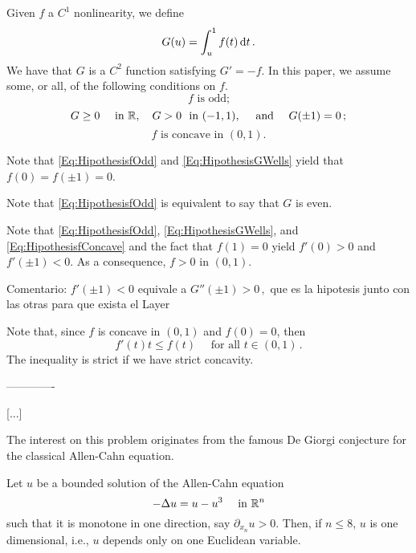 \bigskip
[...]
\bigskip

Given $f$ a $C^1$ nonlinearity, we define
$$
G(u)= \int_u^1 f(t) \,\mathrm{d} t\,.
$$
We have that $G$ is a $C^2$ function satisfying $G' = -f$. In this paper, we assume some, or all, of the following conditions on $f$.
\begin{equation}
\label{Eq:HipothesisfOdd}
f \textrm{ is odd;}
\end{equation}
\begin{equation}
\label{Eq:HipothesisGWells}
G\geq 0 \quad \textrm{ in } \mathbb{R}, \quad G > 0 \ \textrm{ in }  (-1,1), \quad \textrm{ and }\quad G(\pm 1 )=0\,;
\end{equation}
\begin{equation}
\label{Eq:HipothesisfConcave}
f \textrm{ is concave in }  (0,1).
\end{equation}



Note that \eqref{Eq:HipothesisfOdd} and \eqref{Eq:HipothesisGWells} yield that $f(0)=f(\pm 1)=0$. 

Note that \eqref{Eq:HipothesisfOdd} is equivalent to say that $G$ is even.

Note that \eqref{Eq:HipothesisfOdd}, \eqref{Eq:HipothesisGWells}, and \eqref{Eq:HipothesisfConcave} and the fact that $f(1)=0$ yield $f'(0)>0$ and $f'(\pm 1) < 0$. As a consequence, $f > 0$ in $(0,1)$.

Comentario: $f'(\pm 1) < 0$ equivale a $G''(\pm 1) > 0\,,$ que es la hipotesis junto con las otras para que exista el Layer

Note that, since $f$ is concave in $(0,1)$ and $f(0)=0$, then 
\begin{equation}
\label{Eq:PropertyConcavityf}
f'(t)t \leq f(t) \quad \textrm{ for all } t\in (0,1)\,.
\end{equation}
The inequality is strict if we have strict concavity.


\bigskip
\bigskip
\bigskip
-------------
\bigskip
\bigskip
\bigskip

[...]

The interest on this problem originates from the famous De Giorgi conjecture for the classical Allen-Cahn equation.

\begin{conjecture}[De Giorgi, 1978]
	Let $u$ be a bounded solution of the Allen-Cahn equation
	\begin{equation}
	\label{Eq:LocalAllenCahn}
	-\Delta  u = u - u^3 \quad \text{ in } \mathbb{R}^n
	\end{equation}
	such that it is monotone in one direction, say $\partial_{x_n} u > 0$. Then, if $n\leq 8$, $u$ is one dimensional, i.e., $u$ depends only on one Euclidean variable.
\end{conjecture}


